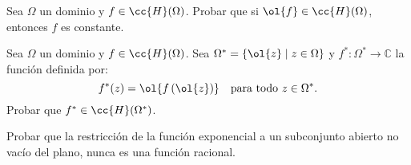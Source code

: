 \begin{ejercicio}
    Sea $\Omega$ un dominio y $f \in \cc{H}(\Omega)$. Probar que si $\ol{f} \in \cc{H}(\Omega)$, entonces $f$ es constante.
\end{ejercicio}

\begin{ejercicio}
    Sea $\Omega$ un dominio y $f \in \cc{H}(\Omega)$. Sea $\Omega^* = \{\ol{z} \mid z \in \Omega\}$ y $f^* : \Omega^* \to \mathbb{C}$ la función definida por:
    \[
        f^*(z) = \ol{f\left(\ol{z}\right)} \quad \text{para todo } z \in \Omega^*.
    \]
    Probar que $f^* \in \cc{H}(\Omega^*)$.
\end{ejercicio}

\begin{ejercicio}
    Probar que la restricción de la función exponencial a un subconjunto abierto no vacío del plano, nunca es una función racional.
\end{ejercicio}